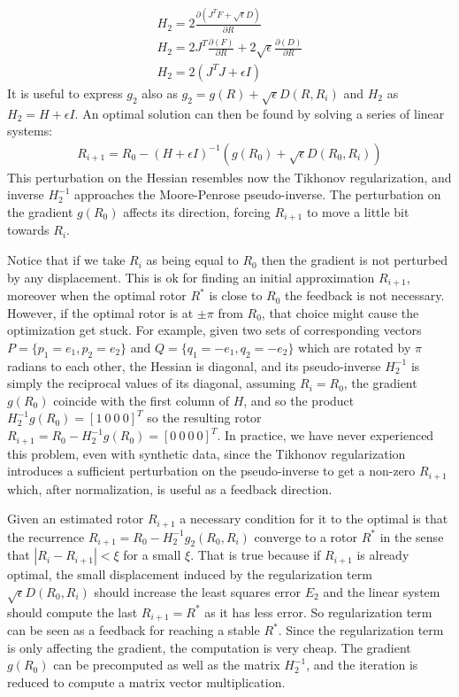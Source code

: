 \documentclass{birkjour}
\numberwithin{equation}{section}
\begin{document}
\begin{eqnarray*}
H_2 = 2 \frac{\partial(J^T F + \sqrt{\epsilon} D)}{\partial R} \\
H_2 = 2 J^T \frac{\partial(F)}{\partial R} + 2 \sqrt{\epsilon} \frac{\partial(D)}{\partial R}\\
H_2 = 2 (J^T J + \epsilon I)
\end{eqnarray*}
It is useful to express $g_2$ also as $g_2 = g(R) + \sqrt{\epsilon} D(R,R_i)$ and $H_2$ as $H_2 = H + \epsilon I$.  
An optimal solution can then be found by solving a series of linear systems:
\begin{eqnarray*}
R_{i+1} = R_0 - (H + \epsilon I)^{-1} (g(R_0) + \sqrt{\epsilon} D(R_0,R_i))
\end{eqnarray*}
This perturbation on the Hessian resembles now the Tikhonov regularization, and inverse $H_2^{-1}$ approaches the Moore-Penrose pseudo-inverse.
The perturbation on the gradient $g(R_0)$ affects its direction, forcing $R_{i+1}$ to move a little bit towards $R_i$.

Notice that if we take $R_i$ as being equal to $R_0$ then the gradient is not perturbed by any displacement. This is ok for finding an initial approximation $R_{i+1}$, moreover when the optimal rotor $R^*$ is close to $R_0$ the feedback is not necessary. However, if the optimal rotor is at $\pm \pi$ from $R_0$, that choice might cause the optimization get stuck. For example, given two sets of corresponding vectors $P = \{p_1=e_1, p_2=e_2\}$ and $Q = \{q_1=-e_1, q_2=-e_2\}$ which are rotated by $\pi$ radians to each other, the Hessian is diagonal, and its pseudo-inverse $H_2^{-1}$ is simply the reciprocal values of its diagonal, assuming $R_i = R_0$, the gradient $g(R_0)$ coincide with the first column of $H$, and so the product $H_2^{-1} g(R_0) = [1 \ 0 \ 0 \ 0]^T$ so the resulting rotor $R_{i+1} = R_0 - H_2^{-1} g(R_0) = [0 \ 0 \ 0 \ 0]^T$. In practice, we have never experienced this problem, even with synthetic data, since the Tikhonov regularization introduces a sufficient perturbation on the pseudo-inverse to get a non-zero $R_{i+1}$ which, after normalization, is useful as a feedback direction.

Given an estimated rotor $R_{i+1}$ a necessary condition for it to the optimal is that the recurrence $R_{i+1} = R_0 - H_2^{-1} g_2(R_0,R_i)$ converge to a rotor $R^*$ in the sense that $|R_i - R_{i+1}| < \xi$ for a small $\xi$. That is true because if $R_{i+1}$ is already optimal, the small displacement induced by the regularization term $\sqrt{\epsilon} D(R_0,R_i)$ should increase the least squares error $E_2$ and the linear system should compute the last $R_{i+1} = R^*$ as it has less error. So regularization term can be seen as a feedback for reaching a stable $R^*$. Since the regularization term is only affecting the gradient, the computation is very cheap. The gradient $g(R_0)$ can be precomputed as well as the matrix $H_2^{-1}$, and the iteration is reduced to compute a matrix vector multiplication.
\end{document}
